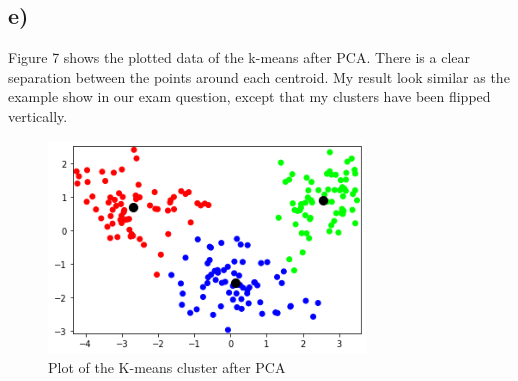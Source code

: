 \subsection {e)}
Figure 7 shows the plotted data of the k-means after PCA. 
There is a clear separation between the points around each centroid. My result look similar
as the example show in our exam question, except that my clusters have been flipped vertically.
\begin{figure}[H]
    \centering
        \includegraphics[width=0.75\textwidth]{Figures/K-means.png}
    \caption{Plot of the K-means cluster after PCA}
\end{figure}
